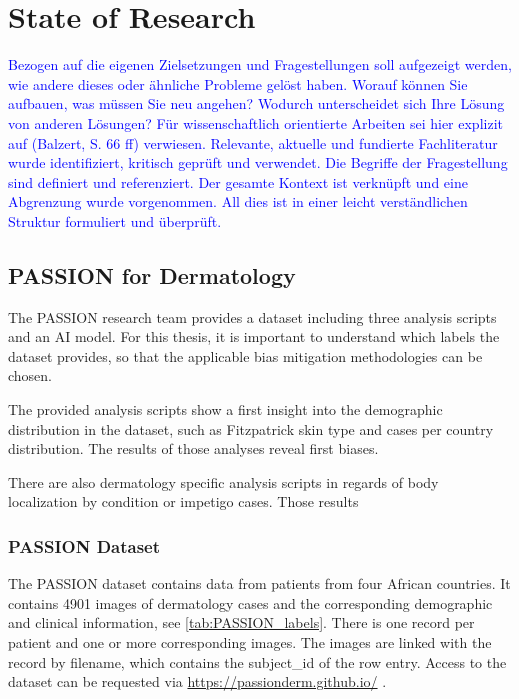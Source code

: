 \documentclass[12pt, a4paper, oneside]{book}   	%
\newcommand{\baaCriteria}[1]{\textcolor{blue}{#1}}
\begin{document}
	\chapter{State of Research}
		\baaCriteria{Bezogen auf die eigenen Zielsetzungen und Fragestellungen soll aufgezeigt werden, wie andere dieses oder ähnliche Probleme gelöst haben. Worauf können Sie aufbauen, was müssen Sie neu angehen?	Wodurch unterscheidet sich Ihre Lösung von anderen Lösungen? Für wissenschaftlich orientierte Arbeiten sei hier explizit auf (Balzert, S. 66 ff) verwiesen.}
		\baaCriteria{Relevante, aktuelle und fundierte Fachliteratur wurde identifiziert, kritisch geprüft und verwendet. Die Begriffe der Fragestellung sind definiert und referenziert. Der gesamte Kontext ist verknüpft und eine Abgrenzung wurde vorgenommen. All dies ist in einer leicht verständlichen Struktur formuliert und überprüft.}
		
		
		\section{PASSION for Dermatology}
			The PASSION research team provides a dataset including three analysis scripts and an AI model. For this thesis, it is important to understand which labels the dataset provides, so that the applicable bias mitigation methodologies can be chosen.
			
			The provided analysis scripts show a first insight into the demographic distribution in the dataset, such as Fitzpatrick skin type and cases per country distribution. The results of those analyses reveal first biases.
			
			There are also dermatology specific analysis scripts in regards of body localization by condition or impetigo cases. Those results 
			
			\subsection{PASSION Dataset}
				The PASSION dataset contains data from patients from four African countries. It contains 4901 images of dermatology cases and the corresponding demographic and clinical information, see \autoref{tab:PASSION_labels}. There is one record per patient and one or more corresponding images. The images are linked with the record by filename, which contains the subject\_id of the row entry. Access to the dataset can be requested via \href{https://passionderm.github.io/}{https://passionderm.github.io/} \autocite{Gottfrois2024}.
				
\end{document}
